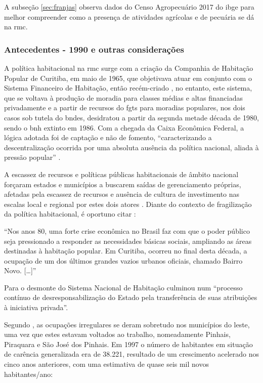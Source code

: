 	A subseção \autoref{sec:franjas} observa dados do Censo Agropecuário 2017 do \glsdesc{ibge} para melhor compreender como a presença de atividades agrícolas e de pecuária se dá na \glsdesc{rmc}.
	
	\subsubsection{Antecedentes - 1990 e outras considerações}
	
	A política habitacional na \glsdesc{rmc} surge com a criação da Companhia de Habitação Popular de Curitiba, em maio de 1965, que objetivava atuar em conjunto com o Sistema Financeiro de Habitação, então recém-criado \cite[p. 81]{colin2009a}, no entanto, este sistema, que se voltava à produção de moradia para classes médias e altas financiadas privadamente e a partir de recursos do \gls{fgts} para moradias populares, nos dois casos sob tutela do \gls{bndes}, desidratou a partir da segunda metade década de 1980, sendo o \gls{bnh} extinto em 1986. Com a chegada da Caixa Econômica Federal, a lógica adotada foi de captação e não de fomento, ``caracterizando a descentralização ocorrida por uma absoluta ausência da política nacional, aliada à pressão popular'' \cite[p. 82]{colin2009a}.
	
	A escassez de recursos e políticas públicas habitacionais de âmbito nacional forçaram estados e municípios a buscarem saídas de gerenciamento próprias, afetadas pela escassez de recursos e ausência de cultura de investimento nas escalas local e regional por estes dois atores \cite[p. 82]{colin2009a}. Diante do contexto de fragilização da política habitacional, é oportuno citar :
	
	\begin{citacao}
		``Nos anos 80, uma forte crise econômica no Brasil faz com que o poder público seja pressionado a responder as necessidades básicas sociais, ampliando as áreas destinadas à habitação popular. Em Curitiba, ocorreu no final desta década, a ocupação de um dos últimos grandes vazios urbanos oficiais, chamado Bairro Novo. [\dots]'' \cite[p. 54]{castro2005a}
	\end{citacao}
	
	Para  o desmonte do Sistema Nacional de Habitação culminou num ``processo contínuo de desresponsabilização do Estado pela transferência de suas atribuições à iniciativa privada''.
	
	Segundo , as ocupações irregulares se deram sobretudo nos municípios do leste, uma vez que estes estavam voltados ao trabalho, nomeadamente  Pinhais, Piraquara e São José dos Pinhais. Em 1997 o número de habitantes em situação de carência generalizada era de 38.221, resultado de um crescimento acelerado nos cinco anos anteriores, com uma estimativa de quase seis mil novos habitantes/ano:
	
